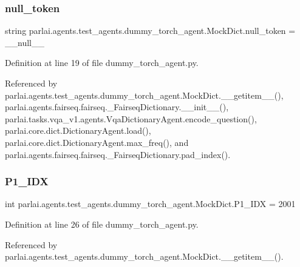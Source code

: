 \subsubsection{\texorpdfstring{null\+\_\+token}{null\_token}}
{\footnotesize\ttfamily string parlai.\+agents.\+test\+\_\+agents.\+dummy\+\_\+torch\+\_\+agent.\+Mock\+Dict.\+null\+\_\+token = \textquotesingle{}\+\_\+\+\_\+null\+\_\+\+\_\+\textquotesingle{}\hspace{0.3cm}{\ttfamily [static]}}



Definition at line 19 of file dummy\+\_\+torch\+\_\+agent.\+py.



Referenced by parlai.\+agents.\+test\+\_\+agents.\+dummy\+\_\+torch\+\_\+agent.\+Mock\+Dict.\+\_\+\+\_\+getitem\+\_\+\+\_\+(), parlai.\+agents.\+fairseq.\+fairseq.\+\_\+\+Fairseq\+Dictionary.\+\_\+\+\_\+init\+\_\+\+\_\+(), parlai.\+tasks.\+vqa\+\_\+v1.\+agents.\+Vqa\+Dictionary\+Agent.\+encode\+\_\+question(), parlai.\+core.\+dict.\+Dictionary\+Agent.\+load(), parlai.\+core.\+dict.\+Dictionary\+Agent.\+max\+\_\+freq(), and parlai.\+agents.\+fairseq.\+fairseq.\+\_\+\+Fairseq\+Dictionary.\+pad\+\_\+index().

\mbox{\label{classparlai_1_1agents_1_1test__agents_1_1dummy__torch__agent_1_1MockDict_a30842b3b794cc768ef1daa5dde5b696c}} 
\subsubsection{\texorpdfstring{P1\+\_\+\+I\+DX}{P1\_IDX}}
{\footnotesize\ttfamily int parlai.\+agents.\+test\+\_\+agents.\+dummy\+\_\+torch\+\_\+agent.\+Mock\+Dict.\+P1\+\_\+\+I\+DX = 2001\hspace{0.3cm}{\ttfamily [static]}}



Definition at line 26 of file dummy\+\_\+torch\+\_\+agent.\+py.



Referenced by parlai.\+agents.\+test\+\_\+agents.\+dummy\+\_\+torch\+\_\+agent.\+Mock\+Dict.\+\_\+\+\_\+getitem\+\_\+\+\_\+().

